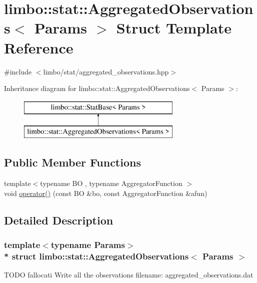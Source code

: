 \hypertarget{structlimbo_1_1stat_1_1_aggregated_observations}{}\section{limbo\+:\+:stat\+:\+:Aggregated\+Observations$<$ Params $>$ Struct Template Reference}
\label{structlimbo_1_1stat_1_1_aggregated_observations}


{\ttfamily \#include $<$limbo/stat/aggregated\+\_\+observations.\+hpp$>$}

Inheritance diagram for limbo\+:\+:stat\+:\+:Aggregated\+Observations$<$ Params $>$\+:\begin{figure}[H]
\begin{center}
\leavevmode
\includegraphics[height=2.000000cm]{structlimbo_1_1stat_1_1_aggregated_observations}
\end{center}
\end{figure}
\subsection*{Public Member Functions}
\begin{DoxyCompactItemize}
\item 
{\footnotesize template$<$typename BO , typename Aggregator\+Function $>$ }\\void \hyperlink{structlimbo_1_1stat_1_1_aggregated_observations_a99c53c6147e0d5ae26a7d4707a978611}{operator()} (const BO \&bo, const Aggregator\+Function \&afun)
\end{DoxyCompactItemize}


\subsection{Detailed Description}
\subsubsection*{template$<$typename Params$>$\\*
struct limbo\+::stat\+::\+Aggregated\+Observations$<$ Params $>$}

T\+O\+DO fallocati Write all the observations filename\+: {\ttfamily aggregated\+\_\+observations.\+dat} 

